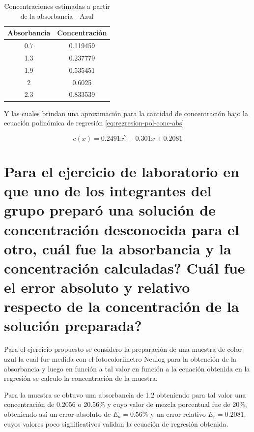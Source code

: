 \begin{table}[]
	\centering
	\begin{tabular}{|c|c|}
		\hline
		\textbf{Absorbancia} & \textbf{Concentración} \\ \hline
		0.7                  & 0.119459               \\ \hline
		1.3                  & 0.237779               \\ \hline
		1.9                  & 0.535451               \\ \hline
		2                    & 0.6025                 \\ \hline
		2.3                  & 0.833539               \\ \hline
	\end{tabular}
	\caption{Concentraciones estimadas a partir de la absorbancia - Azul}
	\label{tab:conc-absorbancia}
\end{table}

Y las cuales brindan una aproximación para la cantidad de concentración bajo la ecuación polinómica de regresión \ref{eq:regresion-pol-conc-abs}

\begin{equation}
	c(x) = 0.2491x^2 - 0.301x + 0.2081
	\label{eq:regresion-pol-conc-abs}
\end{equation}

\section{Para el ejercicio de laboratorio en que uno de los integrantes del grupo preparó una solución de concentración desconocida para el otro, cuál fue la absorbancia y la concentración calculadas?	Cuál fue el error absoluto y relativo respecto de la concentración de la solución preparada?}

Para el ejercicio propuesto se considero la preparación de una muestra de color azul la cual fue medida con el fotocolorimetro Neulog para la obtención de la absorbancia y luego en función a tal valor en función a la ecuación obtenida en la regresión se calculo la concentración de la muestra.

Para la muestra se obtuvo una absorbancia de 1.2 obteniendo para tal valor una concentración de 0.2056 o 20.56\% y cuyo valor de mezcla porcentual fue de 20\%, obteniendo así un error absoluto de $E_a = 0.56 $\% y un error relativo $E_r = 0.2081$, cuyos valores poco significativos validan la ecuación de regresión obtenida.























